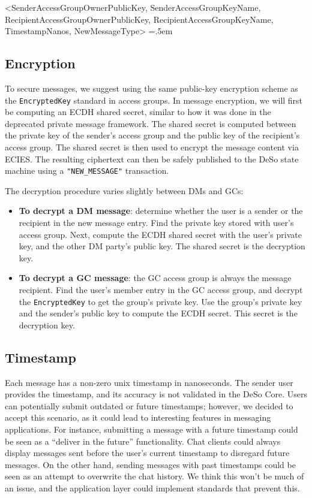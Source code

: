 \documentclass[oneside, 12pt]{article}
\newenvironment{lcverbatim}
 {\SaveVerbatim{cverb}}
 {\endSaveVerbatim
  \flushleft\fboxrule=0pt\fboxsep=.5em
  \colorbox{cverbbg}{%
    \makebox[\dimexpr\linewidth-2\fboxsep][l]{\BUseVerbatim{cverb}}%
  }
  \endflushleft
}
\begin{document}
\begin{scriptsize}
\begin{lcverbatim}
<SenderAccessGroupOwnerPublicKey, SenderAccessGroupKeyName, RecipientAccessGroupOwnerPublicKey,
  RecipientAccessGroupKeyName, TimestampNanos, NewMessageType>
\end{lcverbatim}
\end{scriptsize}

\subsection{Encryption}
To secure messages, we suggest using the same public-key encryption scheme as the \texttt{EncryptedKey} standard in access groups. In message encryption, we will first be computing an ECDH shared secret, similar to how it was done in the deprecated private message framework. The shared secret is computed between the private key of the sender’s access group and the public key of the recipient’s access group. The shared secret is then used to encrypt the message content via ECIES. The resulting ciphertext can then be safely published to the DeSo state machine using a \texttt{"NEW\_MESSAGE"} transaction.

The decryption procedure varies slightly between DMs and GCs:

\begin{itemize}
  \item \textbf{To decrypt a DM message}: determine whether the user is a sender or the recipient in the new message entry. Find the private key stored with user’s access group. Next, compute the ECDH shared secret with the user’s private key, and the other DM party’s public key. The shared secret is the decryption key.
  \item \textbf{To decrypt a GC message}: the GC access group is always the message recipient. Find the user’s member entry in the GC access group, and decrypt the \texttt{EncryptedKey} to get the group’s private key. Use the group’s private key and the sender’s public key to compute the ECDH secret. This secret is the decryption key.
\end{itemize}

\subsection{Timestamp}
Each message has a non-zero unix timestamp in nanoseconds. The sender user provides the timestamp, and its accuracy is not validated in the DeSo Core. Users can potentially submit outdated or future timestamps; however, we decided to accept this scenario, as it could lead to interesting features in messaging applications. For instance, submitting a message with a future timestamp could be seen as a “deliver in the future” functionality. Chat clients could always display messages sent before the user’s current timestamp to disregard future messages. On the other hand, sending messages with past timestamps could be seen as an attempt to overwrite the chat history. We think this won't be much of an issue, and the application layer could implement standards that prevent this.
\end{document}
